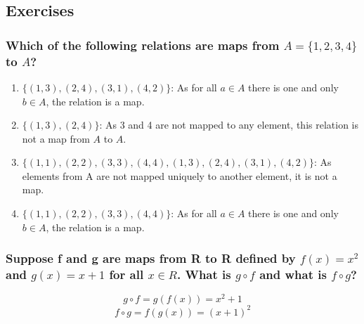 \subsection{Exercises}

\subsubsection{Which of the following relations are maps from $A = \{1, 2, 3, 4\}$ to $A$?}
\begin{enumerate}[label=(\alph*)]
    \item $\{(1,3),(2,4),(3,1),(4,2)\}$: As for all $a \in A$ there is one and only $b \in A$, the relation is a map.
    \item $\{(1,3),(2,4)\}$: As 3 and 4 are not mapped to any element, this relation is not a map from $A$ to $A$.
    \item $\{(1,1),(2,2),(3,3),(4,4),(1,3),(2,4),(3,1),(4,2)\}$: As elements from A are not mapped uniquely
    to another element, it is not a map.
    \item $\{(1, 1), (2, 2), (3, 3), (4, 4)\}$: As for all $a \in A$ there is one and only $b \in A$, the relation is a map.
\end{enumerate}

\subsubsection{Suppose f and g are maps from R to R defined by $f (x) = x^2$ and $g(x) = x + 1$ for all $x \in R$.
What is $g \circ f$ and what is $f \circ g$?}

$$g \circ f = g(f(x)) = x^2+1$$
$$f \circ g = f(g(x)) = (x+1)^2$$


